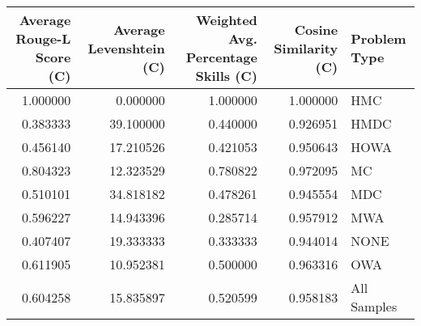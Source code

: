 \begin{tabular}{rrrrl}
\toprule
Average Rouge-L Score (C) & Average Levenshtein (C) & Weighted Avg. Percentage Skills (C) & Cosine Similarity (C) & Problem Type \\
\midrule
1.000000 & 0.000000 & 1.000000 & 1.000000 & HMC \\
0.383333 & 39.100000 & 0.440000 & 0.926951 & HMDC \\
0.456140 & 17.210526 & 0.421053 & 0.950643 & HOWA \\
0.804323 & 12.323529 & 0.780822 & 0.972095 & MC \\
0.510101 & 34.818182 & 0.478261 & 0.945554 & MDC \\
0.596227 & 14.943396 & 0.285714 & 0.957912 & MWA \\
0.407407 & 19.333333 & 0.333333 & 0.944014 & NONE \\
0.611905 & 10.952381 & 0.500000 & 0.963316 & OWA \\
0.604258 & 15.835897 & 0.520599 & 0.958183 & All Samples \\
\bottomrule
\end{tabular}
